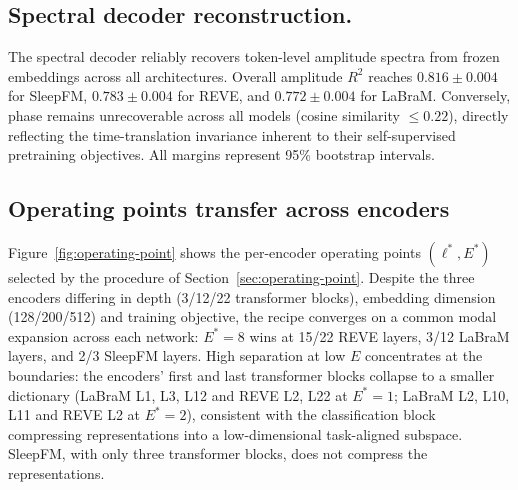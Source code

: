 \documentclass{article}
\begin{document}
\subsection{Spectral decoder reconstruction.} The spectral decoder reliably recovers token-level amplitude spectra from frozen embeddings across all architectures. Overall amplitude $R^2$ reaches $0.816 \pm 0.004$ for SleepFM, $0.783 \pm 0.004$ for REVE, and $0.772 \pm 0.004$ for LaBraM. 
Conversely, phase remains unrecoverable across all models (cosine similarity $\le 0.22$), directly reflecting the time-translation invariance inherent to their self-supervised pretraining objectives. All margins represent 95\% bootstrap intervals.


\subsection{Operating points transfer across encoders}

Figure~\ref{fig:operating-point} shows the per-encoder operating points                                                  
  $(\ell^*, E^*)$ selected by the procedure of                
  Section~\ref{sec:operating-point}. Despite the three encoders differing in depth (3/12/22 transformer blocks), embedding dimension 
  (128/200/512) and training objective, the recipe converges on a common modal expansion across each network: $E^* = 8$ wins at 15/22 REVE layers, 3/12 LaBraM layers, and 2/3 SleepFM layers. High separation at low $E$ concentrates at the boundaries: the encoders' first and last transformer blocks collapse to a smaller dictionary (LaBraM L1, L3, L12 and REVE L2, L22 at $E^* = 1$; LaBraM L2, L10, L11 and REVE L2 at $E^* = 2$), consistent with the classification block compressing representations into a low-dimensional task-aligned subspace. SleepFM, with only three transformer blocks, does not compress the representations.


\end{document}
